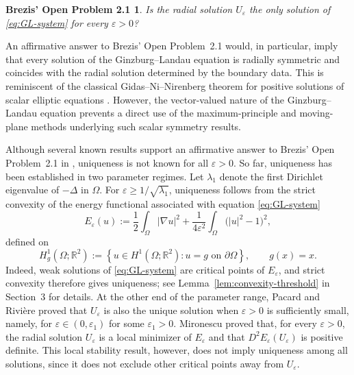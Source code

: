 \documentclass[11pt]{amsart}
\theoremstyle{definition}
\theoremstyle{plain}
\newtheorem*{brezisproblem}{Brezis' Open Problem 2.1 \cite{Brezis2023}}
\newcommand{\abs}[1]{\lvert#1\rvert}
\numberwithin{equation}{section}
\begin{document}
\begin{brezisproblem}
	Is the radial solution $U_\varepsilon$ the only solution of
	\eqref{eq:GL-system} for every $\varepsilon>0$?
\end{brezisproblem}
An affirmative answer to Brezis' Open Problem~2.1 would, in particular,
imply that every solution of the Ginzburg--Landau equation is radially
symmetric and coincides with the radial solution determined by the
boundary data. This is reminiscent of the classical Gidas--Ni--Nirenberg theorem for positive solutions of scalar elliptic equations
\cite{GidasNiNirenberg1979}. However, the vector-valued nature of the
Ginzburg--Landau equation prevents a direct use of the maximum-principle
and moving-plane methods underlying such scalar symmetry results.





Although several known results support an affirmative answer to Brezis' Open Problem~2.1 in \cite{Brezis2023}, uniqueness is not known for all $\varepsilon>0$. So far, uniqueness has been established in two parameter regimes. Let $\lambda_1$ denote the first Dirichlet eigenvalue of $-\Delta$ in $\Omega$. For $\varepsilon\geq1/\sqrt{\lambda_1}$, uniqueness follows from the strict convexity of the energy functional associated with equation \eqref{eq:GL-system}
\[
E_\varepsilon(u)
:=
\frac{1}{2}\int_{\Omega}\abs{\nabla u}^{2}
+
\frac{1}{4\varepsilon^{2}}
\int_{\Omega}\bigl(\abs{u}^{2}-1\bigr)^{2},
\]
defined on
\[
H_g^1(\Omega;\mathbb R^2)
:=
\left\{
u\in H^1(\Omega;\mathbb R^2):
u=g \text{ on }\partial\Omega
\right\},
\qquad
g(x)=x.
\]
Indeed, weak solutions of \eqref{eq:GL-system} are critical points of $E_\varepsilon$, and strict convexity therefore gives uniqueness; see Lemma~\ref{lem:convexity-threshold} in Section~3 for details. At the other end of the parameter range, Pacard and Rivi\`ere \cite{PacardRiviere2000} proved that $U_\varepsilon$ is also the unique solution when $\varepsilon>0$ is sufficiently small, namely, for $\varepsilon\in(0,\varepsilon_1)$ for some $\varepsilon_1>0$. Mironescu \cite{Mironescu1995} proved that, for every $\varepsilon>0$, the radial solution $U_\varepsilon$ is a local minimizer of $E_\varepsilon$ and that $D^2E_\varepsilon(U_\varepsilon)$ is positive definite. This local stability result, however, does not imply uniqueness among all solutions, since it does not exclude other critical points away from $U_\varepsilon$.
\end{document}
